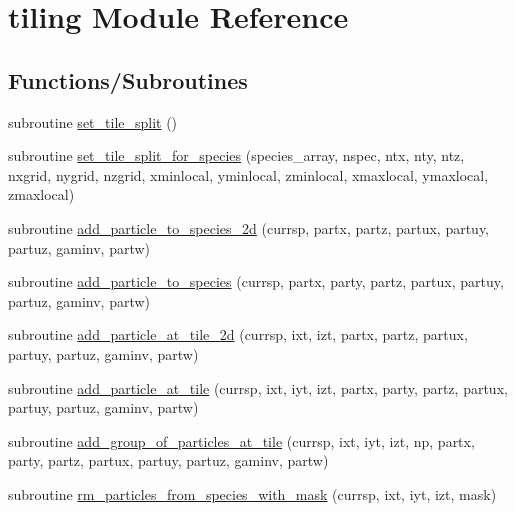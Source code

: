 \hypertarget{namespacetiling}{}\section{tiling Module Reference}
\label{namespacetiling}
\subsection*{Functions/\+Subroutines}
\begin{DoxyCompactItemize}
\item 
subroutine \hyperlink{namespacetiling_ae08843ba623397e395f3cdc2e10ffc12}{set\+\_\+tile\+\_\+split} ()
\item 
subroutine \hyperlink{namespacetiling_a7c0b0347269c73ea27ea2290e8417185}{set\+\_\+tile\+\_\+split\+\_\+for\+\_\+species} (species\+\_\+array, nspec, ntx, nty, ntz, nxgrid, nygrid, nzgrid,           	xminlocal, yminlocal, zminlocal, xmaxlocal, ymaxlocal, zmaxlocal)
\item 
subroutine \hyperlink{namespacetiling_a6d78403de2ce67688301c28455638363}{add\+\_\+particle\+\_\+to\+\_\+species\+\_\+2d} (currsp, partx, partz,                                                       partux, partuy, partuz, gaminv, partw)
\item 
subroutine \hyperlink{namespacetiling_a4aaddc2230da22ad8bf1bb439f24b3ee}{add\+\_\+particle\+\_\+to\+\_\+species} (currsp, partx, party, partz,                                                       partux, partuy, partuz, gaminv, partw)
\item 
subroutine \hyperlink{namespacetiling_acd2c914a7012265a66a69aedbb714ab9}{add\+\_\+particle\+\_\+at\+\_\+tile\+\_\+2d} (currsp, ixt, izt, partx, partz,                                                           partux, partuy, partuz, gaminv, partw)
\item 
subroutine \hyperlink{namespacetiling_a359fbc74072f7cc701885efa8440a648}{add\+\_\+particle\+\_\+at\+\_\+tile} (currsp, ixt, iyt, izt, partx, party, partz,                                                           partux, partuy, partuz, gaminv, partw)
\item 
subroutine \hyperlink{namespacetiling_a95ecc37c280961f5c094916b0fbf9724}{add\+\_\+group\+\_\+of\+\_\+particles\+\_\+at\+\_\+tile} (currsp, ixt, iyt, izt, np, partx, party,                                           partz, partux, partuy, partuz, gaminv, partw)
\item 
subroutine \hyperlink{namespacetiling_ad4f03c522071b6b40bc01c16b5aa1bdd}{rm\+\_\+particles\+\_\+from\+\_\+species\+\_\+with\+\_\+mask} (currsp, ixt, iyt, izt, mask)

\end{DoxyCompactItemize}
